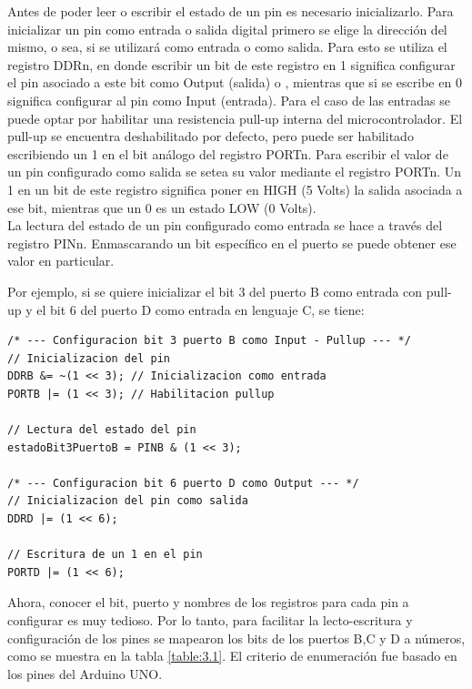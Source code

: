 Antes de poder leer o escribir el estado de un pin es necesario inicializarlo. Para inicializar un pin como entrada o salida digital primero se elige la dirección del mismo, o sea, si se utilizará como entrada o como salida. Para esto se utiliza el registro DDRn, en donde escribir un bit de este registro en 1 significa configurar el pin asociado a este bit como Output (salida) o , mientras que si se escribe en 0 significa configurar al pin como Input (entrada). Para el caso de las entradas se puede optar por habilitar una resistencia pull-up interna del microcontrolador. El pull-up se encuentra deshabilitado por defecto, pero puede ser habilitado escribiendo un 1 en el bit análogo del registro PORTn.
Para escribir el valor de un pin configurado como salida se setea su valor mediante el registro PORTn. Un 1 en un bit de este registro significa poner en HIGH (5 Volts) la salida asociada a ese bit, mientras que un 0 es un estado LOW (0 Volts).\\
La lectura del estado de un pin configurado como entrada se hace a través del registro PINn. Enmascarando un bit específico en el puerto se puede obtener ese valor en particular.

Por ejemplo, si se quiere inicializar el bit 3 del puerto B como entrada con pull-up y el bit 6 del puerto D como entrada en lenguaje C, se tiene:

\begin{lstlisting}[style=CStyle]
/* --- Configuracion bit 3 puerto B como Input - Pullup --- */
// Inicializacion del pin
DDRB &= ~(1 << 3); // Inicializacion como entrada
PORTB |= (1 << 3); // Habilitacion pullup

// Lectura del estado del pin
estadoBit3PuertoB = PINB & (1 << 3);

/* --- Configuracion bit 6 puerto D como Output --- */
// Inicializacion del pin como salida
DDRD |= (1 << 6); 

// Escritura de un 1 en el pin
PORTD |= (1 << 6); 
\end{lstlisting}

Ahora, conocer el bit, puerto y nombres de los registros para cada pin a configurar es muy tedioso. Por lo tanto, para facilitar la lecto-escritura y configuración de los pines se mapearon los bits de los puertos B,C y D a números, como se muestra en la tabla \ref{table:3.1}. El criterio de enumeración fue basado en los pines del Arduino UNO.


